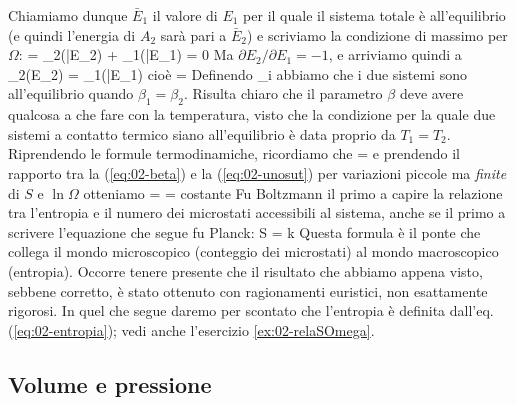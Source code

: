 Chiamiamo dunque $\bar{E}_{1}$ il valore di $E_{1}$ per il quale il sistema totale è all'equilibrio (e quindi l'energia di $A_{2}$ sarà pari a $\bar{E}_{2}$) e scriviamo la condizione di massimo per $\Omega$:
\be
\label{eq:02-maxomega1}
 = \Omega_{2}(\bar{E_{2}}) + \Omega_{1}(\bar{E}_{1}) = 0
\ee
Ma $\partial E_{2}/\partial E_{1} = -1$, e arriviamo quindi a
\be
\label{eq:02-maxomega2}
\Omega_{2}(E_{2}) = \Omega_{1}(\bar{E}_{1})
\ee
cioè
\be
\label{eq:02-maxomega3}
 = 
\ee
Definendo
\be
\label{eq:02-beta}
\beta_i \equiv {}
\ee
abbiamo che i due sistemi sono all'equilibrio quando $\beta_{1} = \beta_{2}$. Risulta chiaro che il parametro $\beta$ deve avere qualcosa a che fare con la temperatura, visto che la condizione per la quale due sistemi a contatto termico siano all'equilibrio è data proprio da $T_{1} = T_{2}$. Riprendendo le formule termodinamiche, ricordiamo che
\be
\label{eq:02-unosut}
 = 
\ee
e prendendo il rapporto tra la (\ref{eq:02-beta}) e la (\ref{eq:02-unosut}) per variazioni piccole ma {\em finite} di $S$ e $\ln{\Omega}$ otteniamo
\be
\label{eq:02-deltaomega}
 =  = \mbox{costante}
\ee
Fu Boltzmann il primo a capire la relazione tra l'entropia e il numero dei microstati accessibili al sistema, anche se il primo a scrivere l'equazione che segue fu Planck:
\be
\label{eq:02-entropia}
S = k\ln \Omega
\ee
Questa formula è il ponte che collega il mondo microscopico (conteggio dei microstati) al mondo macroscopico (entropia). Occorre tenere presente che il risultato che abbiamo appena visto, sebbene corretto, è stato ottenuto con ragionamenti euristici, non esattamente rigorosi. In quel che segue daremo per scontato che l'entropia è definita dall'eq. (\ref{eq:02-entropia}); vedi anche l'esercizio \ref{ex:02-relaSOmega}.

\subsection{Volume e pressione}

